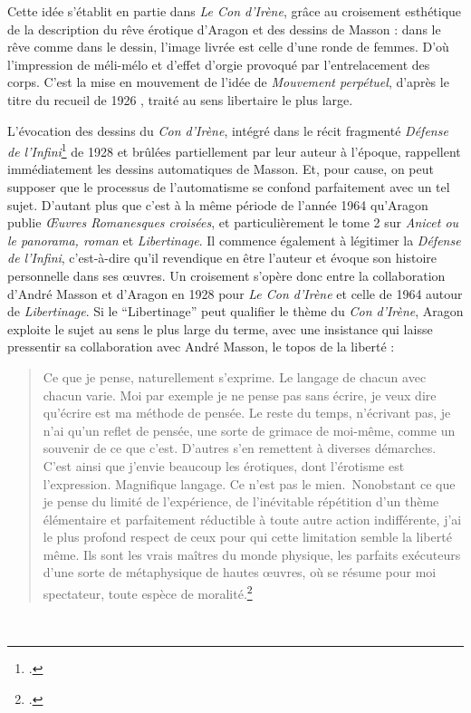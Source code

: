 Cette idée s’établit en partie dans \emph{Le Con d’Irène}, grâce au croisement esthétique de la description du rêve érotique d’Aragon et des dessins de Masson : dans le rêve comme dans le dessin, l’image livrée est celle d’une ronde de femmes. D’où l’impression de méli-mélo et d’effet d’orgie provoqué par l’entrelacement des corps. C’est la mise en mouvement de l’idée de \emph{Mouvement perpétuel}, d’après le titre du recueil de  1926 , traité au sens libertaire le plus large.


L’évocation des dessins du \emph{Con d’Irène}, intégré dans le récit fragmenté \emph{Défense de l’Infini}\footcite{defense} de 1928 et brûlées partiellement par leur auteur à l’époque, rappellent immédiatement les dessins automatiques de Masson. Et, pour cause, on peut supposer que le processus de l’automatisme se confond parfaitement avec un tel sujet. D’autant plus que c’est à la même période de l’année 1964 qu’Aragon publie \emph{\OE{}uvres Romanesques croisées}, et particulièrement le tome 2 sur \emph{Anicet ou le panorama, roman} et \emph{Libertinage}. Il commence également à légitimer la \emph{Défense de l’Infini}, c’est-à-dire qu’il revendique en être l’auteur et évoque son histoire personnelle dans ses \oe{}uvres. Un croisement s’opère donc entre la collaboration d’André Masson et d’Aragon en 1928 pour \emph{Le Con d’Irène} et celle de 1964 autour de \emph{Libertinage}. Si le \enquote{Libertinage} peut qualifier le thème du \emph{Con d’Irène}, Aragon exploite le sujet au sens le plus large du terme, avec une insistance qui laisse pressentir sa collaboration avec André Masson, le topos de la liberté : 

\begin{quote}
Ce que je pense, naturellement s’exprime. Le langage de chacun avec chacun varie. Moi par exemple je ne pense pas sans écrire, je veux dire qu’écrire est ma méthode de pensée. Le reste du temps, n’écrivant pas, je n’ai qu’un reflet de pensée, une sorte de grimace de moi-même, comme un souvenir de ce que c’est. D’autres s’en remettent à diverses démarches. C’est ainsi que j’envie beaucoup les érotiques, dont l’érotisme est l’expression. Magnifique langage. Ce n’est pas le mien. Nonobstant ce que je pense du limité de l’expérience, de l’inévitable répétition d’un thème élémentaire et parfaitement réductible à toute autre action indifférente, j’ai le plus profond respect de ceux pour qui cette limitation semble la liberté même. Ils sont les vrais maîtres du monde physique, les parfaits exécuteurs d’une sorte de métaphysique de hautes \oe{}uvres, où se résume pour moi spectateur, toute espèce de moralité.\footcite[p266]{defense}	
\end{quote}
 


